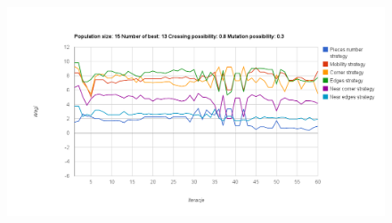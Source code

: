 \begin{figure}[h!]
\centering
\includegraphics[width=\textwidth]{img/chart18.png}
\end{figure}

\pagebreak